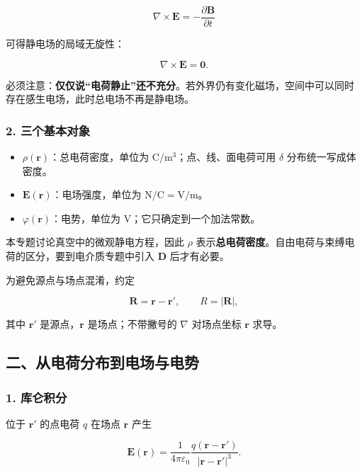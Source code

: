 \[
\nabla\times\mathbf E=-\frac{\partial\mathbf B}{\partial t}
\]

可得静电场的局域无旋性：

\[
\boxed{\nabla\times\mathbf E=\mathbf 0}.
\]

必须注意：\textbf{仅仅说``电荷静止''还不充分}。若外界仍有变化磁场，空间中可以同时存在感生电场，此时总电场不再是静电场。

\subsubsection{2.
三个基本对象}\label{m2:ux4e09ux4e2aux57faux672cux5bf9ux8c61}

\begin{itemize}
\tightlist
\item
  \(\rho(\mathbf r)\)：总电荷密度，单位为
  \(\mathrm{C/m^3}\)；点、线、面电荷可用 \(\delta\) 分布统一写成体密度。
\item
  \(\mathbf E(\mathbf r)\)：电场强度，单位为
  \(\mathrm{N/C}=\mathrm{V/m}\)。
\item
  \(\varphi(\mathbf r)\)：电势，单位为
  \(\mathrm V\)；它只确定到一个加法常数。
\end{itemize}

本专题讨论真空中的微观静电方程，因此 \(\rho\)
表示\textbf{总电荷密度}。自由电荷与束缚电荷的区分，要到电介质专题中引入
\(\mathbf D\) 后才有必要。

为避免源点与场点混淆，约定

\[
\mathbf R=\mathbf r-\mathbf r',
\qquad
R=|\mathbf R|,
\]

其中 \(\mathbf r'\) 是源点，\(\mathbf r\) 是场点；不带撇号的 \(\nabla\)
对场点坐标 \(\mathbf r\) 求导。

\subsection{二、从电荷分布到电场与电势}\label{m2:ux4e8cux4eceux7535ux8377ux5206ux5e03ux5230ux7535ux573aux4e0eux7535ux52bf}

\subsubsection{1. 库仑积分}\label{m2:ux5e93ux4ed1ux79efux5206}

位于 \(\mathbf r'\) 的点电荷 \(q\) 在场点 \(\mathbf r\) 产生

\[
\mathbf E(\mathbf r)
=
\frac{1}{4\pi\varepsilon_0}
\frac{q(\mathbf r-\mathbf r')}{|\mathbf r-\mathbf r'|^3}.
\]

